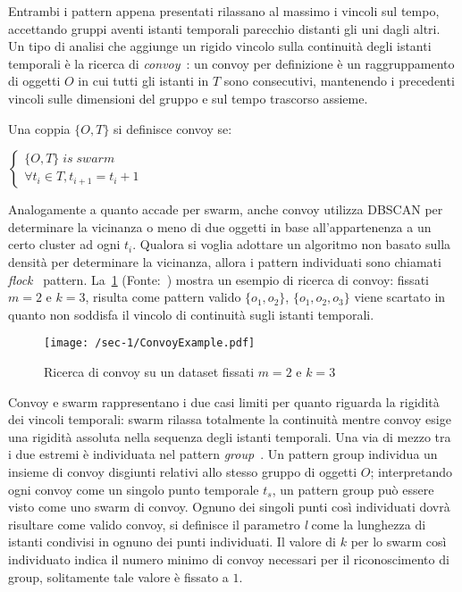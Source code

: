 Entrambi i pattern appena presentati rilassano al massimo i vincoli sul tempo,
accettando gruppi aventi istanti temporali parecchio distanti gli uni dagli altri.
Un tipo di analisi che aggiunge un rigido vincolo sulla continuità degli istanti temporali è
la ricerca di \textit{convoy}~\cite{jeung2008convoy}: un convoy per definizione è un raggruppamento di oggetti \(O\) in cui
tutti gli istanti in \(T\) sono consecutivi, mantenendo i precedenti vincoli sulle dimensioni del
gruppo e sul tempo trascorso assieme.

\begin{definition}[Convoy]\label{definition:convoy}
  Una coppia \( \{ O, T \} \) si definisce convoy se:
  \begin{center}
    \(
      \begin{cases}
         \{ O, T \} \; is \; swarm   \\
      \forall t_{i} \in T, t_{i+1} = t_{i} + 1
      \end{cases}
    \)

  \end{center}
\end{definition}

Analogamente a quanto accade per swarm, anche convoy utilizza DBSCAN per determinare
la vicinanza o meno di due oggetti in base all'appartenenza a un certo cluster ad ogni
\(t_{i}\).
Qualora si voglia adottare un algoritmo non basato sulla densità per determinare la vicinanza, allora i
pattern individuati sono chiamati \textit{flock}~\cite{benkert2008reporting} pattern.
La~\cref{fig:chap-1:ConvoyExample} (Fonte:~\cite{phan2016all}) mostra un esempio di ricerca di convoy: fissati \(m=2\)
e \(k=3\), risulta come pattern valido \( \{ o_{1}, o_{2}\} \),
\( \{ o_{1}, o_{2}, o_{3}\} \) viene scartato in quanto non soddisfa il vincolo di continuità
sugli istanti temporali.

\begin{figure}
  \centering
  \texttt{[image: /sec-1/ConvoyExample.pdf]}
  \caption{Ricerca di convoy su un dataset fissati \(m=2\) e \(k=3\)}%
  \label{fig:chap-1:ConvoyExample}
\end{figure}

Convoy e swarm rappresentano i due casi limiti per quanto riguarda la rigidità dei vincoli temporali:
swarm rilassa totalmente la continuità mentre convoy esige una rigidità assoluta nella sequenza
degli istanti temporali.
Una via di mezzo tra i due estremi è individuata nel pattern \textit{group}~\cite{wang2006efficient}.
Un pattern group individua un insieme di convoy disgiunti relativi allo stesso gruppo di oggetti \(O\);
interpretando ogni convoy come un singolo punto temporale \(t_{s}\), un pattern group può essere visto come uno swarm
di convoy.
Ognuno dei singoli punti così individuati dovrà risultare come valido convoy, si definisce
il parametro \textit{l} come la lunghezza di istanti condivisi in ognuno dei punti individuati.
Il valore di \(k\) per lo swarm così individuato indica il numero minimo di convoy necessari per il riconoscimento di group,
solitamente tale valore è fissato a \(1\).

